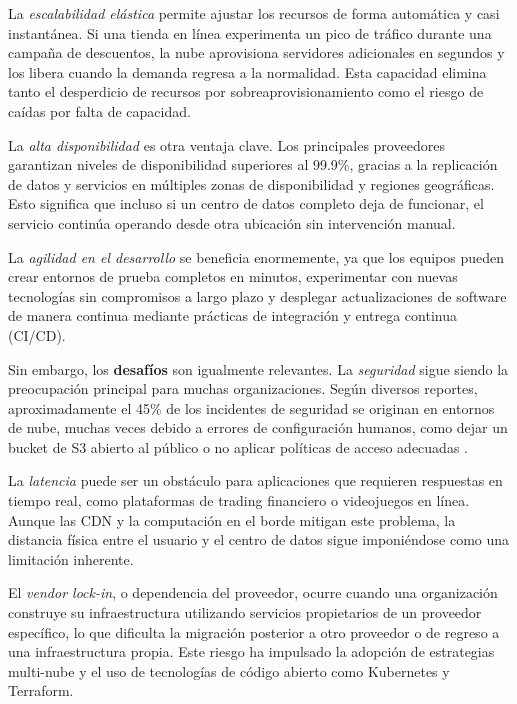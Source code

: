 \documentclass[letterpaper,11pt]{article}
\begin{document}
    La \textit{escalabilidad elástica} permite ajustar los recursos de forma automática y casi instantánea. Si una tienda en línea experimenta un pico de tráfico durante una campaña de descuentos, la nube aprovisiona servidores adicionales en segundos y los libera cuando la demanda regresa a la normalidad. Esta capacidad elimina tanto el desperdicio de recursos por sobreaprovisionamiento como el riesgo de caídas por falta de capacidad.

    La \textit{alta disponibilidad} es otra ventaja clave. Los principales proveedores garantizan niveles de disponibilidad superiores al 99.9\%, gracias a la replicación de datos y servicios en múltiples zonas de disponibilidad y regiones geográficas. Esto significa que incluso si un centro de datos completo deja de funcionar, el servicio continúa operando desde otra ubicación sin intervención manual.

    La \textit{agilidad en el desarrollo} se beneficia enormemente, ya que los equipos pueden crear entornos de prueba completos en minutos, experimentar con nuevas tecnologías sin compromisos a largo plazo y desplegar actualizaciones de software de manera continua mediante prácticas de integración y entrega continua (CI/CD).

    Sin embargo, los \textbf{desafíos} son igualmente relevantes. La \textit{seguridad} sigue siendo la preocupación principal para muchas organizaciones. Según diversos reportes, aproximadamente el 45\% de los incidentes de seguridad se originan en entornos de nube, muchas veces debido a errores de configuración humanos, como dejar un bucket de S3 abierto al público o no aplicar políticas de acceso adecuadas \parencite{cyberdefense-cloud2025}.

    La \textit{latencia} puede ser un obstáculo para aplicaciones que requieren respuestas en tiempo real, como plataformas de trading financiero o videojuegos en línea. Aunque las CDN y la computación en el borde mitigan este problema, la distancia física entre el usuario y el centro de datos sigue imponiéndose como una limitación inherente.

    El \textit{vendor lock-in}, o dependencia del proveedor, ocurre cuando una organización construye su infraestructura utilizando servicios propietarios de un proveedor específico, lo que dificulta la migración posterior a otro proveedor o de regreso a una infraestructura propia. Este riesgo ha impulsado la adopción de estrategias multi-nube y el uso de tecnologías de código abierto como Kubernetes y Terraform.
\end{document}
